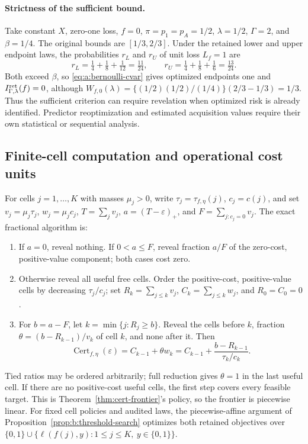 \paragraph{Strictness of the sufficient bound.}
Take constant $X$, zero-one loss, $f=0$, $\pi=p_1=p_A=1/2$, $\lambda=1/2$,
$\Gamma=2$, and $\beta=1/4$. The original bounds are $[1/3,2/3]$.
Under the retained lower and upper endpoint laws, the probabilities $r_L$ and
$r_U$ of unit loss $L_f=1$ are
\[
 r_L=\tfrac14+\tfrac18+\tfrac1{12}=\tfrac{11}{24},\qquad
 r_U=\tfrac14+\tfrac18+\tfrac16=\tfrac{13}{24}.
\]
Both exceed $\beta$, so \eqref{eq:a:bernoulli-cvar} gives optimized endpoints
one and $I^{\rm ret}_{\Gamma,\lambda}(f)=0$, although
$W_{f,0}(\lambda)=\{(1/2)(1/2)/(1/4)\}(2/3-1/3)=1/3$.
Thus the sufficient criterion can require revelation when optimized risk is
already identified. Predictor reoptimization and estimated acquisition values
require their own statistical or sequential analysis.

\subsection{Finite-cell computation and operational cost units}
\label{app:finite-cell}
For cells $j=1,\ldots,K$ with masses $\mu_j>0$, write
$\tau_j=\tau_{f,\eta}(j)$, $c_j=c(j)$, and set
$v_j=\mu_j\tau_j$, $w_j=\mu_jc_j$, $T=\sum_jv_j$, $a=(T-\varepsilon)_+$,
and $F=\sum_{j:c_j=0}v_j$. The exact fractional algorithm is:
\begin{enumerate}
\item If $a=0$, reveal nothing. If $0<a\leq F$, reveal fraction $a/F$ of the
zero-cost, positive-value component; both cases cost zero.
\item Otherwise reveal all useful free cells. Order the positive-cost,
positive-value cells by decreasing $\tau_j/c_j$; set
$R_k=\sum_{j\leq k}v_j$, $C_k=\sum_{j\leq k}w_j$, and $R_0=C_0=0$.
\item For $b=a-F$, let $k=\min\{j:R_j\geq b\}$. Reveal the cells before $k$,
fraction $\theta=(b-R_{k-1})/v_k$ of cell $k$, and none after it. Then
\begin{equation}
 \operatorname{Cert}_{f,\eta}(\varepsilon)
 =C_{k-1}+\theta w_k
 =C_{k-1}+\frac{b-R_{k-1}}{\tau_k/c_k}.
 \label{eq:c-finite-frontier}
\end{equation}
\end{enumerate}
Tied ratios may be ordered arbitrarily; full reduction gives $\theta=1$ in the
last useful cell. If there are no positive-cost useful cells, the first step
covers every feasible target. This is Theorem~\ref{thm:cert-frontier}'s policy,
so the frontier is piecewise linear. For fixed cell policies and audited laws,
the piecewise-affine argument of Proposition~\ref{prop:b:threshold-search}
optimizes both retained objectives over
$\{0,1\}\cup\{\ell(f(j),y):1\leq j\leq K,\ y\in\{0,1\}\}$.

